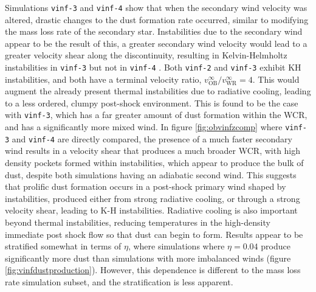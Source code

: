 \documentclass[fleqn,usenatbib]{mnras}
\begin{document}
Simulations \texttt{vinf-3} and \texttt{vinf-4} show that when the secondary wind velocity was altered, drastic changes to the dust formation rate occurred, similar to modifying the mass loss rate of the secondary star.
Instabilities due to the secondary wind appear to be the result of this, a greater secondary wind velocity would lead to a greater velocity shear along the discontinuity, resulting in Kelvin-Helmholtz instabilities in \texttt{vinf-3} but not in \texttt{vinf-4} \citep{stevens_colliding_1992}.
Both \texttt{vinf-2} and \texttt{vinf-3} exhibit KH instabilities, and both have a terminal velocity ratio, $v_\text{OB}^\infty / v_\text{WR}^\infty = 4$.
This would augment the already present thermal instabilities due to radiative cooling, leading to a less ordered, clumpy post-shock environment.
This is found to be the case with \texttt{vinf-3}, which has a far greater amount of dust formation within the WCR, and has a significantly more mixed wind.
In figure \ref{fig:obvinfzcomp} where \texttt{vinf-3} and \texttt{vinf-4} are directly compared, the presence of a much faster secondary wind results in a velocity shear that produces a much broader WCR, with high density pockets formed within instabilities, which appear to produce the bulk of dust, despite both simulations having an adiabatic second wind. 
This suggests that prolific dust formation occurs in a post-shock primary wind shaped by instabilities, produced either from strong radiative cooling, or through a strong velocity shear, leading to K-H instabilities.
Radiative cooling is also important beyond thermal instabilities, reducing temperatures in the high-density immediate post shock flow so that dust can begin to form.
Results appear to be stratified somewhat in terms of $\eta$, where simulations where $\eta = 0.04$ produce significantly more dust than simulations with more imbalanced winds (figure \ref{fig:vinfdustproduction}).
However, this dependence is different to the mass loss rate simulation subset, and the stratification is less apparent.
\end{document}
